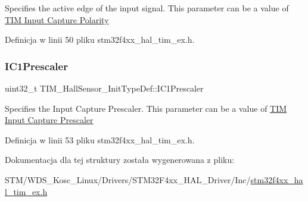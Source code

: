 Specifies the active edge of the input signal. This parameter can be a value of \hyperlink{group___t_i_m___input___capture___polarity}{T\+IM Input Capture Polarity} 

Definicja w linii 50 pliku stm32f4xx\+\_\+hal\+\_\+tim\+\_\+ex.\+h.

\mbox{\label{struct_t_i_m___hall_sensor___init_type_def_ac6c54e891cbe5afec92676219978209e}} 
\subsubsection{\texorpdfstring{I\+C1\+Prescaler}{IC1Prescaler}}
{\footnotesize\ttfamily uint32\+\_\+t T\+I\+M\+\_\+\+Hall\+Sensor\+\_\+\+Init\+Type\+Def\+::\+I\+C1\+Prescaler}

Specifies the Input Capture Prescaler. This parameter can be a value of \hyperlink{group___t_i_m___input___capture___prescaler}{T\+IM Input Capture Prescaler} 

Definicja w linii 53 pliku stm32f4xx\+\_\+hal\+\_\+tim\+\_\+ex.\+h.



Dokumentacja dla tej struktury została wygenerowana z pliku\+:\begin{DoxyCompactItemize}
\item 
S\+T\+M/\+W\+D\+S\+\_\+\+Kosc\+\_\+\+Linux/\+Drivers/\+S\+T\+M32\+F4xx\+\_\+\+H\+A\+L\+\_\+\+Driver/\+Inc/\hyperlink{stm32f4xx__hal__tim__ex_8h}{stm32f4xx\+\_\+hal\+\_\+tim\+\_\+ex.\+h}\end{DoxyCompactItemize}
